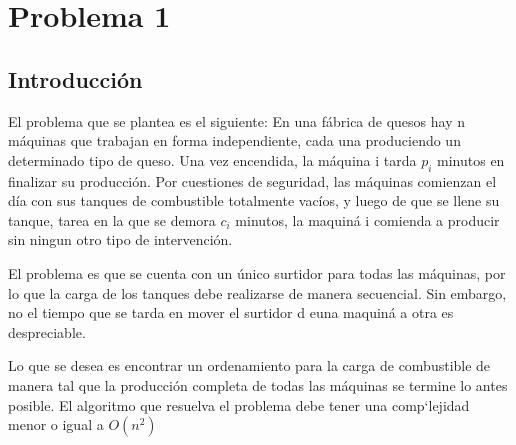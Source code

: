 \section{Problema 1}
 
\subsection{Introducci\'on}
El problema que se plantea es el siguiente: 
En una f\'abrica de quesos hay n m\'aquinas que trabajan en forma independiente, cada una produciendo un
determinado tipo de queso. Una vez encendida, la m\'aquina i tarda $p_i$ minutos en finalizar su producci\'on.
Por cuestiones de seguridad, las m\'aquinas comienzan el d\'ia con sus tanques de combustible totalmente vac\'ios, y
 luego de que se llene su tanque, tarea en la que se demora $c_i$ minutos, la maquin\'a i comienda a producir sin ningun otro tipo de intervenci\'on.

El problema es que se cuenta con un \'unico surtidor para todas las m\'aquinas, por lo que la carga de los tanques debe realizarse de manera secuencial.
Sin embargo, no el tiempo que se tarda en mover el surtidor d euna maquin\'a a otra es despreciable.

Lo que se desea es encontrar un ordenamiento para la carga de combustible de manera tal que la producci\'on completa de
todas las m\'aquinas se termine lo antes posible. El algoritmo que resuelva el problema debe tener una comp`lejidad menor o igual a $O(n^2)$

